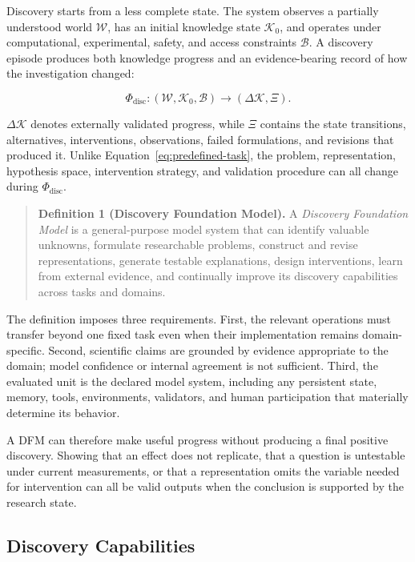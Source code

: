 \documentclass[11pt, a4paper, copyright]{google}
\begin{document}
Discovery starts from a less complete state. The system observes a partially understood world $\mathcal{W}$, has an initial knowledge state $\mathcal{K}_0$, and operates under computational, experimental, safety, and access constraints $\mathcal{B}$. A discovery episode produces both knowledge progress and an evidence-bearing record of how the investigation changed:

\begin{equation}
\Phi_{\mathrm{disc}}:
(\mathcal{W},\mathcal{K}_0,\mathcal{B})
\longrightarrow
(\Delta\mathcal{K},\Xi).
\label{eq:discovery-episode}
\end{equation}

$\Delta\mathcal{K}$ denotes externally validated progress, while $\Xi$ contains the state transitions, alternatives, interventions, observations, failed formulations, and revisions that produced it. Unlike Equation~\ref{eq:predefined-task}, the problem, representation, hypothesis space, intervention strategy, and validation procedure can all change during $\Phi_{\mathrm{disc}}$.

\begin{quote}
\noindent
\textbf{Definition 1 (Discovery Foundation Model).} A \emph{Discovery Foundation Model} is a general-purpose model system that can identify valuable unknowns, formulate researchable problems, construct and revise representations, generate testable explanations, design interventions, learn from external evidence, and continually improve its discovery capabilities across tasks and domains.
\end{quote}

The definition imposes three requirements. First, the relevant operations must transfer beyond one fixed task even when their implementation remains domain-specific. Second, scientific claims are grounded by evidence appropriate to the domain; model confidence or internal agreement is not sufficient. Third, the evaluated unit is the declared model system, including any persistent state, memory, tools, environments, validators, and human participation that materially determine its behavior.

A DFM can therefore make useful progress without producing a final positive discovery. Showing that an effect does not replicate, that a question is untestable under current measurements, or that a representation omits the variable needed for intervention can all be valid outputs when the conclusion is supported by the research state.

\subsection{Discovery Capabilities}
\label{subsec:necessary-capabilities}
\end{document}
